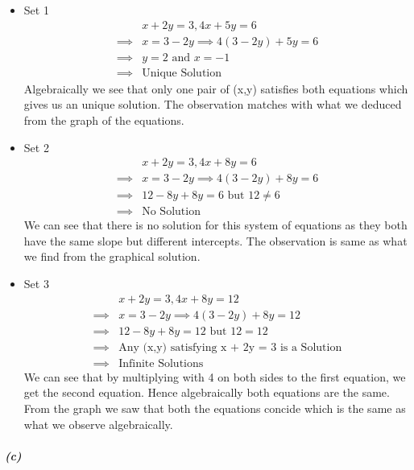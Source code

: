 \documentclass[12pt, letterpaper]{article}
\begin{document}
\begin{itemize}
\item Set 1 
  \[\begin{split}
  &x + 2y = 3, 4x + 5y = 6\\
  \implies &x = 3 - 2y \implies 4(3-2y) + 5y = 6\\
  \implies &y = 2\text{ and }x = -1\\
  \implies &\boxed{\text{Unique Solution}}
  \end{split} \]
  Algebraically we see that only one pair of (x,y) satisfies both equations which gives us an unique solution. The observation matches with what we deduced from the graph of the equations.
\item Set 2 
  \[\begin{split}
  &x + 2y = 3, 4x + 8y = 6\\
  \implies &x = 3 - 2y \implies 4(3-2y) + 8y = 6\\
  \implies &12 -8y +8y = 6\text{ but }12 \not = 6\\
  \implies &\boxed{\text{No Solution}}
  \end{split} \]
  We can see that there is no solution for this system of equations as they both have the same slope but different intercepts. The observation is same as what we find from the graphical solution.
\item Set 3 
  \[\begin{split}
  &x + 2y = 3, 4x + 8y = 12\\
  \implies &x = 3 - 2y \implies 4(3-2y) + 8y = 12\\
  \implies &12 -8y +8y = 12\text{ but }12 = 12\\
  \implies &\text{Any (x,y) satisfying x + 2y = 3 is a Solution}\\
  \implies &\boxed{\text{Infinite Solutions}}
  \end{split} \]
  We can see that by multiplying with 4 on both sides to the first equation, we get the second equation. Hence algebraically both equations are the same. From the graph we saw that both the equations concide which is the same as what we observe algebraically.
\end{itemize}

\subparagraph{(c)}
\end{document}

